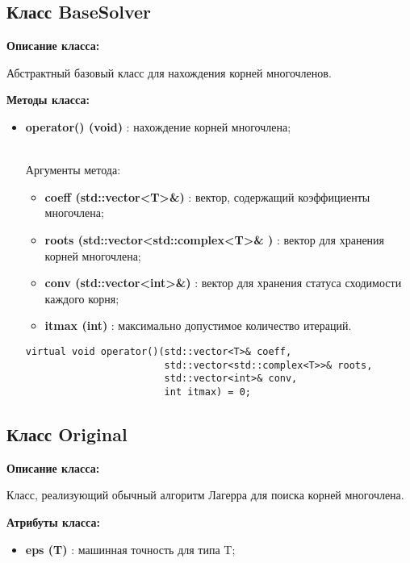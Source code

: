 \documentclass[a4paper,12pt]{article}
\begin{document}
\subsection{Класс BaseSolver}
\textbf{Описание класса:}

Абстрактный базовый класс для нахождения корней многочленов. 

\textbf{Методы класса:}
\begin{itemize}
    \item \textbf{operator() (void)} : нахождение корней многочлена;

\\Аргументы метода:
    \begin{itemize}
        \renewcommand{\labelitemi}{-}
        \item \textbf{coeff (std::vector<T>\&)} : вектор, содержащий коэффициенты многочлена;
        \item \textbf{roots (std::vector<std::complex<T>\& )} : вектор для хранения корней многочлена;
        \item \textbf{conv (std::vector<int>\&)} : вектор для хранения статуса сходимости каждого корня;
        \item \textbf{itmax (int)} : максимально допустимое количество итераций.
    \end{itemize}
\begin{lstlisting}[language=С++]
virtual void operator()(std::vector<T>& coeff, 
                        std::vector<std::complex<T>>& roots, 
                        std::vector<int>& conv, 
                        int itmax) = 0; \end{lstlisting}
\end{itemize}
\subsection{Класс Original}
\textbf{Описание класса:}

Класс, реализующий обычный алгоритм Лагерра для поиска корней многочлена.

\textbf{Атрибуты класса:}
\begin{itemize}
\renewcommand{\labelitemi}{-}
    \item \textbf{eps (T)} : машинная точность для типа T;
\end{itemize}
\end{document}
